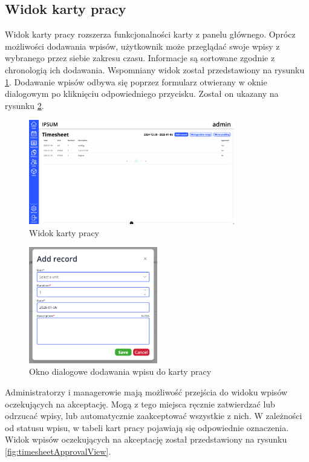 \subsection{Widok karty pracy}

Widok karty pracy rozszerza funkcjonalności karty z panelu głównego. Oprócz możliwości dodawania wpisów, użytkownik może przeglądać swoje wpisy z wybranego przez siebie zakresu czasu. Informacje są sortowane zgodnie z chronologią ich dodawania. Wspomniany widok został przedstawiony na rysunku \ref{fig:timesheetView}. Dodawanie wpisów odbywa się poprzez formularz otwierany w oknie dialogowym po kliknięciu odpowiedniego przycisku. Został on ukazany na rysunku \ref{fig:timesheetDialog}.

\begin{figure}[H]
    \centering
    \includegraphics[width=0.8\textwidth, frame]{graf/front/timesheet.png}
    \caption{Widok karty pracy}
    \label{fig:timesheetView}
\end{figure}

\begin{figure}[H]
    \centering
    \includegraphics[width=0.5\textwidth]{graf/front/timesheetAddRecord.png}
    \caption{Okno dialogowe dodawania wpisu do karty pracy}
    \label{fig:timesheetDialog}
\end{figure}

Administratorzy i managerowie mają możliwość przejścia do widoku wpisów oczekujących na akceptację. Mogą z tego miejsca ręcznie zatwierdzać lub odrzucać wpisy, lub automatycznie zaakceptować wszystkie z nich. W zależności od statusu wpisu, w tabeli kart pracy pojawiają się odpowiednie oznaczenia. Widok wpisów oczekujących na akceptację został przedstawiony na rysunku \ref{fig:timesheetApprovalView}.

